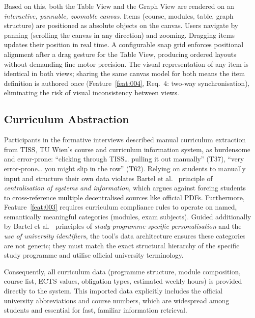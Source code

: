 Based on this, both the Table View and the Graph View are rendered on an \emph{interactive, pannable, zoomable canvas}. Items (course, modules, table, graph structure) are positioned as absolute objects on the canvas. Users navigate by panning (scrolling the canvas in any direction) and zooming. Dragging items updates their position in real time. A configurable snap grid enforces positional alignment after a drag gesture for the Table View, producing ordered layouts without demanding fine motor precision. The visual representation of any item is identical in both views; sharing the same canvas model for both means the item definition is authored once (Feature~\ref{feat:004}, Req.~4: two-way synchronisation), eliminating the risk of visual inconsistency between views.

\subsection{Curriculum Abstraction}
\label{sec:curriculum-abstraction}

Participants in the formative interviews described manual curriculum extraction from TISS, TU Wien's course and curriculum information system, as burdensome and error-prone: \enquote{clicking through TISS… pulling it out manually} (T37), \enquote{very error-prone… you might slip in the row} (T62). Relying on students to manually input and structure their own data violates Bartel et al.~\cite{bartel_design_2024} principle of \emph{centralisation of systems and information}, which argues against forcing students to cross-reference multiple decentralised sources like official PDFs. Furthermore, Feature~\ref{feat:003} requires curriculum compliance rules to operate on named, semantically meaningful categories (modules, exam subjects). Guided additionally by Bartel et al.~\cite{bartel_design_2024} principles of \emph{study-programme-specific personalisation} and the \emph{use of university identifiers}, the tool's data architecture ensures these categories are not generic; they must match the exact structural hierarchy of the specific study programme and utilise official university terminology.

Consequently, all curriculum data (programme structure, module composition, course list, ECTS values, obligation types, estimated weekly hours) is provided directly to the system. This imported data explicitly includes the official university abbreviations and course numbers, which are widespread among students and essential for fast, familiar information retrieval. 

